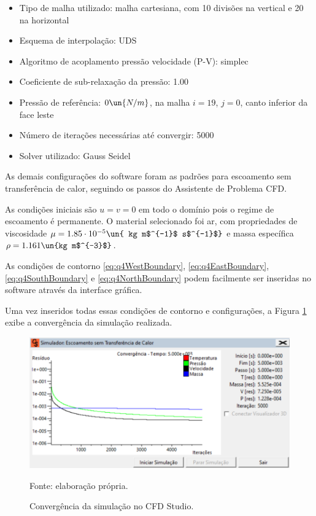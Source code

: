 \begin{itemize}
    \item Tipo de malha utilizado: malha cartesiana, com 10 divisões na vertical e 20 na horizontal
    \item Esquema de interpolação: UDS
    \item Algoritmo de acoplamento pressão velocidade (P-V): simplec
    \item Coeficiente de sub-relaxação da pressão: 1.00
    \item Pressão de referência: $0 \un{N/m}$, na malha $i = 19$, $j = 0$, canto inferior da face leste
    \item Número de iterações necessárias até convergir: 5000
    \item Solver utilizado: Gauss Seidel
\end{itemize}

As demais configurações do software foram as padrões para escoamento sem transferência de calor,
seguindo os passos do Assistente de Problema CFD.

As condições iniciais são $u = v = 0$ em todo o domínio pois o regime de escoamento é permanente.
O material selecionado foi ar, com propriedades de viscosidade $\mu=1.85 \cdot 10^{-5} \un{ kg m$^{-1}$ s$^{-1}$}$ e
massa específica $\rho=1.161 \un{kg m$^{-3}$}$.

As condições de contorno \eqref{eq:q4WestBoundary}, \eqref{eq:q4EastBoundary}, 
\eqref{eq:q4SouthBoundary} e \eqref{eq:q4NorthBoundary} podem facilmente ser inseridas 
no software através da interface gráfica. 

Uma vez inseridos todas essas condições de contorno e configurações, a Figura \ref*{fig:convergencia}
exibe a convergência da simulação realizada.

\begin{figure}[h!]
    \caption{Convergência da simulação no CFD Studio.}
    \label{fig:convergencia}
    \centering
    \centerline{\includegraphics[scale=0.45]{convergencia.png}}
    \par{Fonte: elaboração própria.}
\end{figure}

